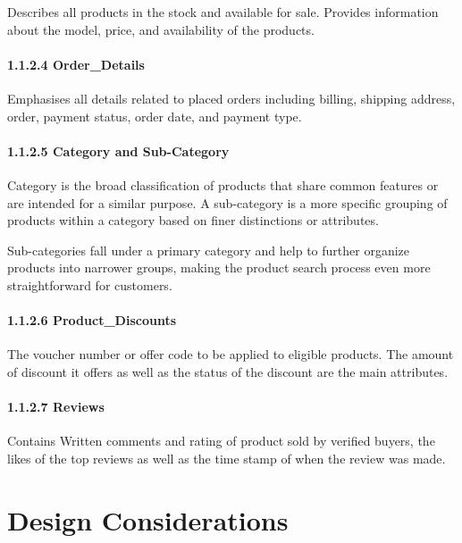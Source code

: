 \documentclass[
]{article}
\begin{document}
Describes all products in the stock and available for sale. Provides
information about the model, price, and availability of the products.

\hypertarget{order_details}{%
\paragraph{1.1.2.4 Order\_Details}\label{order_details}}

Emphasises all details related to placed orders including billing,
shipping address, order, payment status, order date, and payment type.

\hypertarget{category-and-sub-category}{%
\paragraph{1.1.2.5 Category and
Sub-Category}\label{category-and-sub-category}}

Category is the broad classification of products that share common
features or are intended for a similar purpose. A sub-category is a more
specific grouping of products within a category based on finer
distinctions or attributes.

Sub-categories fall under a primary category and help to further
organize products into narrower groups, making the product search
process even more straightforward for customers.

\hypertarget{product_discounts}{%
\paragraph{1.1.2.6 Product\_Discounts}\label{product_discounts}}

The voucher number or offer code to be applied to eligible products. The
amount of discount it offers as well as the status of the discount are
the main attributes.

\hypertarget{reviews}{%
\paragraph{1.1.2.7 Reviews}\label{reviews}}

Contains Written comments and rating of product sold by verified buyers,
the likes of the top reviews as well as the time stamp of when the
review was made.

\hypertarget{design-considerations}{%
\section{Design Considerations}\label{design-considerations}}
\end{document}
